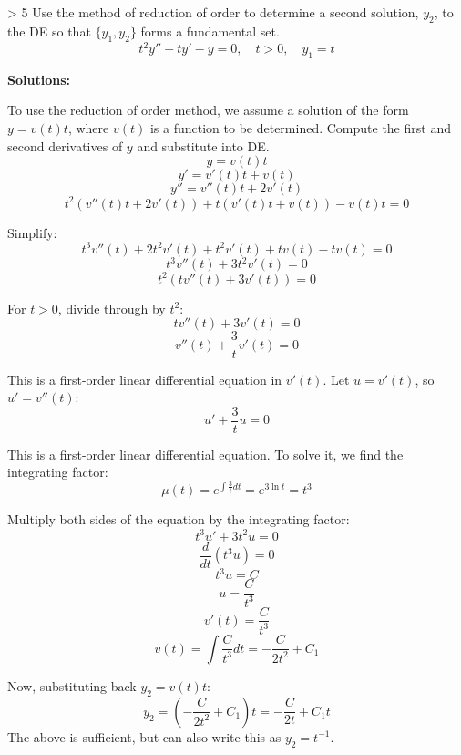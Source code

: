 \ifnum \Version > 5
\question[6] Use the method of reduction of order to determine a second solution, $y_2$, to the DE so that $\{y_1,y_2\}$ forms a fundamental set.
$$t^2y'' + ty' - y = 0, \quad t > 0, \quad y_1 = t$$
\ifnum {} {\color{DarkBlue} 
\textbf{Solutions:}

To use the reduction of order method, we assume a solution of the form \( y = v(t) t \), where \( v(t) \) is a function to be determined. Compute the first and second derivatives of \( y \) and substitute into DE. 
   \[ y = v(t) t \]
   \[ y' = v'(t) t + v(t) \]
   \[ y'' = v''(t) t + 2 v'(t) \]
   \[ t^2 (v''(t) t + 2 v'(t)) + t (v'(t) t + v(t)) - v(t) t = 0 \]

Simplify:
   \[ t^3 v''(t) + 2 t^2 v'(t) + t^2 v'(t) + t v(t) - t v(t) = 0 \]
   \[ t^3 v''(t) + 3 t^2 v'(t) = 0 \]
   \[ t^2 (t v''(t) + 3 v'(t)) = 0 \]

For \( t > 0 \), divide through by \( t^2 \):
   \[ t v''(t) + 3 v'(t) = 0 \]
   \[ v''(t) + \frac{3}{t} v'(t) = 0 \]

This is a first-order linear differential equation in \( v'(t) \). Let \( u = v'(t) \), so \( u' = v''(t) \):
   \[ u' + \frac{3}{t} u = 0 \]

This is a first-order linear differential equation. To solve it, we find the integrating factor:
   \[ \mu(t) = e^{\int \frac{3}{t} dt} = e^{3 \ln t} = t^3 \]

Multiply both sides of the equation by the integrating factor:
   \[ t^3 u' + 3 t^2 u = 0 \]
   \[ \frac{d}{dt} (t^3 u) = 0 \]
   \[ t^3 u = C \]
   \[ u = \frac{C}{t^3} \]
   \[ v'(t) = \frac{C}{t^3} \]
   \[ v(t) = \int \frac{C}{t^3} dt = -\frac{C}{2t^2} + C_1 \]

Now, substituting back \( y_2 = v(t) t \):
   \[ y_2 = \left( -\frac{C}{2t^2} + C_1 \right) t = -\frac{C}{2t} + C_1 t \]
   The above is sufficient, but can also write this as $y_2 = t^{-1}$. 



} 
\else 
\newpage
\fi
\fi 









